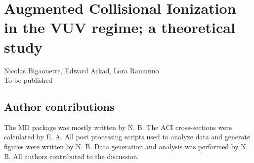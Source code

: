 
\newcommand{\PaperTitleHundrednm}{Augmented Collisional Ionization in the VUV regime; a theoretical study}

\section{\PaperTitleHundrednm}
\label{section:papers:100nm}

\begin{flushright}
Nicolas Bigaouette, Edward Ackad, Lora Ramunno\\
To be published
\end{flushright}

\HidePDFAbstractNumber

\subsection{Author contributions}
The MD package was mostly written by N. B. The ACI cross-sections were calculated
by E. A. All post processing scripts used to analyze data and generate figures
were written by N. B. Data generation and analysis was performed by N. B.
All authors contributed to the discussion.



